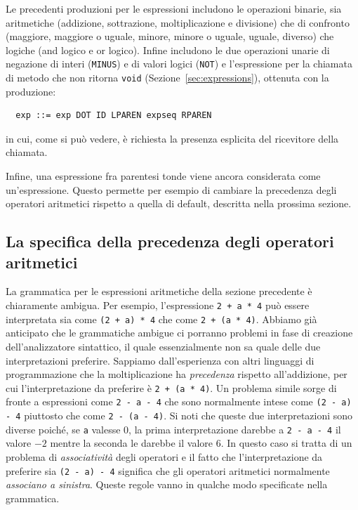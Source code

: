 Le precedenti produzioni per le espressioni includono le operazioni
binarie, sia aritmetiche (addizione, sottrazione, moltiplicazione e
divisione) che di confronto (maggiore, maggiore o uguale, minore, minore
o uguale, uguale, diverso) che logiche (and logico e or logico).
Infine includono le due operazioni unarie di negazione di interi
(\texttt{MINUS}) e di valori logici (\texttt{NOT}) e l'espressione
per la chiamata di metodo che non ritorna \texttt{void}
(Sezione~\ref{sec:expressions}), ottenuta con la produzione:
%
\begin{verbatim}
  exp ::= exp DOT ID LPAREN expseq RPAREN
\end{verbatim}
%
in cui, come si pu\`o vedere, \`e richiesta la presenza esplicita
del ricevitore della chiamata.

Infine, una espressione fra parentesi tonde viene ancora considerata
come un'espressione. Questo permette per esempio
di cambiare la precedenza degli operatori aritmetici rispetto a quella
di default, descritta nella prossima sezione.
%
\subsection{La specifica della precedenza degli operatori aritmetici}
  \label{subsec:priorities}
%
La grammatica per le espressioni aritmetiche della sezione precedente
\`e chiaramente ambigua. Per esempio, l'espressione
\texttt{2 + a * 4} pu\`o essere interpretata sia come
\texttt{(2 + a) * 4} che come \texttt{2 + (a * 4)}. Abbiamo gi\`a anticipato
che le grammatiche ambigue ci porranno problemi in fase di creazione
dell'analizzatore sintattico, il quale essenzialmente non sa quale delle
due interpretazioni preferire. Sappiamo dall'esperienza con altri linguaggi
di programmazione che la moltiplicazione ha \emph{precedenza} rispetto
all'addizione, per cui l'interpretazione da preferire \`e
\texttt{2 + (a * 4)}. Un problema simile sorge di fronte a espressioni come
\texttt{2 - a - 4} che sono normalmente intese come
\texttt{(2 - a) - 4} piuttosto che come \texttt{2 - (a - 4)}. Si noti che
queste due interpretazioni sono diverse poich\'e, se \texttt{a} valesse
$0$, la prima interpretazione darebbe a
\texttt{2 - a - 4} il valore $-2$ mentre la seconda le darebbe il valore $6$.
In questo caso si tratta di un problema di \emph{associativit\`a}
degli operatori e il fatto che l'interpretazione da preferire sia
\texttt{(2 - a) - 4} significa che gli operatori aritmetici normalmente
\emph{associano a sinistra}.
Queste regole vanno in qualche modo specificate nella grammatica.

